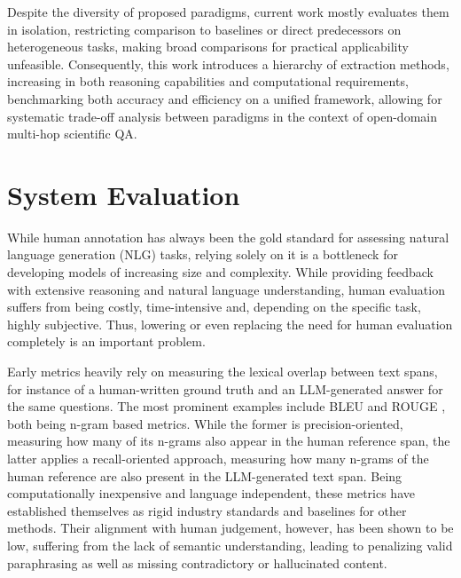 Despite the diversity of proposed paradigms, current work mostly evaluates them in isolation, restricting comparison to baselines or direct predecessors on heterogeneous tasks, making broad comparisons for practical applicability unfeasible. Consequently, this work introduces a hierarchy of extraction methods, increasing in both reasoning capabilities and computational requirements, benchmarking both accuracy and efficiency on a unified framework, allowing for systematic trade-off analysis between paradigms in the context of open-domain multi-hop scientific QA.

\section{System Evaluation}
While human annotation has always been the gold standard for assessing natural language generation (NLG) tasks, relying solely on it is a bottleneck for developing models of increasing size and complexity. While providing feedback with extensive reasoning and natural language understanding, human evaluation suffers from being costly, time-intensive and, depending on the specific task, highly subjective. Thus, lowering or even replacing the need for human evaluation completely is an important problem. 

Early metrics heavily rely on measuring the lexical overlap between text spans, for instance of a human-written ground truth and an LLM-generated answer for the same questions. The most prominent examples include BLEU \cite{bleu} and ROUGE \cite{rouge}, both being n-gram based metrics. While the former is precision-oriented, measuring how many of its n-grams also appear in the human reference span, the latter applies a recall-oriented approach, measuring how many n-grams of the human reference are also present in the LLM-generated text span. Being computationally inexpensive and language independent, these metrics have established themselves as rigid industry standards and baselines for other methods. Their alignment with human judgement, however, has been shown to be low, suffering from the lack of semantic understanding, leading to penalizing valid paraphrasing as well as missing contradictory or hallucinated content.

